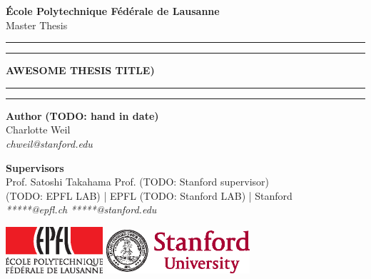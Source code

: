 
\begin{titlingpage}
\begin{center}
\Large
\textbf{École Polytechnique Fédérale de Lausanne} \\
\vspace{1cm}
Master Thesis
\vspace{2cm}
\hrule
\vspace{0.1cm}
\hrule
\vspace{1cm}
\Huge
\textbf{AWESOME THESIS TITLE)} \\
\vspace{1cm}
\hrule
\vspace{0.1cm}
\hrule
\end{center}
\vfill
\noindent \textbf{Author} \hfill \textbf{(TODO: hand in date)} \\
Charlotte Weil \\
\textit{chweil@stanford.edu} \\
\vspace{0.5cm}

\noindent \textbf{Supervisors} \\
Prof. Satoshi Takahama          \hfill    Prof. (TODO: Stanford supervisor) \\
(TODO: EPFL LAB) | EPFL      \hfill    (TODO: Stanford LAB) | Stanford \\
\textit{*****@epfl.ch} \hfill    \textit{*****@stanford.edu} \\
\vspace{0.8cm}

\noindent
\includegraphics[width=0.27\textwidth]{images/epfl-logo.eps}
\hfill
\includegraphics[width=0.4\textwidth]{images/stanford-logo.eps}

\end{titlingpage}

